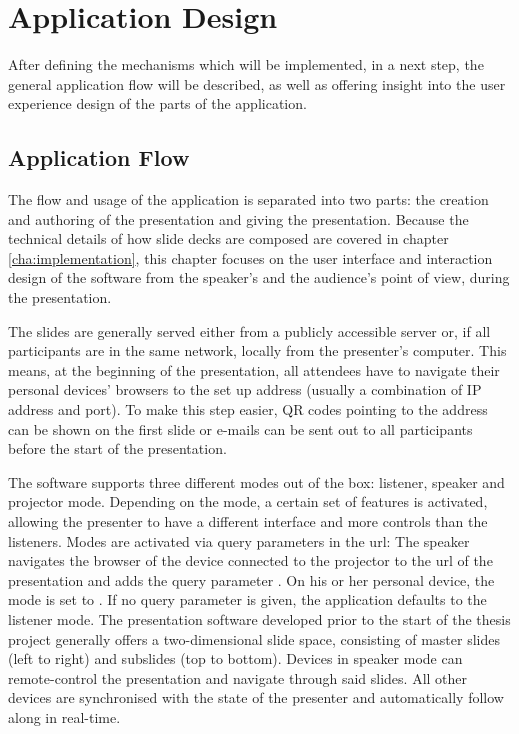 \chapter{Application Design}
\label{cha:design}

After defining the mechanisms which will be implemented, in a next step, the general application flow will be described, as well as offering insight into the user experience design of the parts of the application.

\section{Application Flow}
The flow and usage of the application is separated into two parts: the creation and authoring of the presentation and giving the presentation. Because the technical details of how slide decks are composed are covered in chapter \ref{cha:implementation}, this chapter focuses on the user interface and interaction design of the software from the speaker's and the audience's point of view, during the presentation.

The slides are generally served either from a publicly accessible server or, if all participants are in the same network, locally from the presenter's computer. This means, at the beginning of the presentation, all attendees have to navigate their personal devices' browsers to the set up address (usually a combination of IP address and port). To make this step easier, QR codes pointing to the address can be shown on the first slide or e-mails can be sent out to all participants before the start of the presentation.

The software supports three different modes out of the box: listener, speaker and projector mode. Depending on the mode, a certain set of features is activated, allowing the presenter to have a different interface and more controls than the listeners. Modes are activated via query parameters in the url: The speaker navigates the browser of the device connected to the projector to the url of the presentation and adds the query parameter . On his or her personal device, the mode is set to . If no query parameter is given, the application defaults to the listener mode. The presentation software developed prior to the start of the thesis project generally offers a two-dimensional slide space, consisting of master slides (left to right) and subslides (top to bottom). Devices in speaker mode can remote-control the presentation and navigate through said slides. All other devices are synchronised with the state of the presenter and automatically follow along in real-time.

